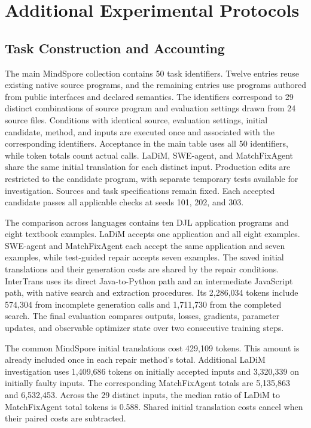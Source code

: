 \section{Additional Experimental Protocols}
\label{sec:supplementary-protocols}

\subsection{Task Construction and Accounting}
\label{sec:task-construction}

The main MindSpore collection contains 50 task identifiers. Twelve entries reuse existing native source programs, and the remaining entries use programs authored from public interfaces and declared semantics. The identifiers correspond to 29 distinct combinations of source program and evaluation settings drawn from 24 source files. Conditions with identical source, evaluation settings, initial candidate, method, and inputs are executed once and associated with the corresponding identifiers. Acceptance in the main table uses all 50 identifiers, while token totals count actual calls. LaDiM, SWE-agent, and MatchFixAgent share the same initial translation for each distinct input. Production edits are restricted to the candidate program, with separate temporary tests available for investigation. Sources and task specifications remain fixed. Each accepted candidate passes all applicable checks at seeds 101, 202, and 303.

The comparison across languages contains ten DJL application programs and eight textbook examples. LaDiM accepts one application and all eight examples. SWE-agent and MatchFixAgent each accept the same application and seven examples, while test-guided repair accepts seven examples. The saved initial translations and their generation costs are shared by the repair conditions. InterTrans uses its direct Java-to-Python path and an intermediate JavaScript path, with native search and extraction procedures. Its 2,286,034 tokens include 574,304 from incomplete generation calls and 1,711,730 from the completed search. The final evaluation compares outputs, losses, gradients, parameter updates, and observable optimizer state over two consecutive training steps.

The common MindSpore initial translations cost 429,109 tokens. This amount is already included once in each repair method's total. Additional LaDiM investigation uses 1,409,686 tokens on initially accepted inputs and 3,320,339 on initially faulty inputs. The corresponding MatchFixAgent totals are 5,135,863 and 6,532,453. Across the 29 distinct inputs, the median ratio of LaDiM to MatchFixAgent total tokens is 0.588. Shared initial translation costs cancel when their paired costs are subtracted.

